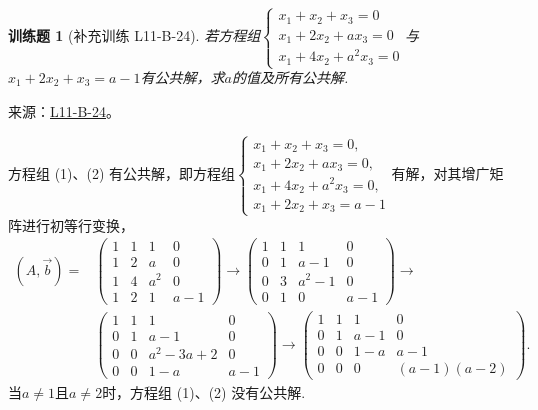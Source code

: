 \documentclass[UTF8,12pt,a4paper,fontset=fandol]{ctexart}
\newtheorem{exercise}{训练题}[section]
\begin{document}
\begin{exercise}[补充训练 L11-B-24]\label{prob:L11-B-24}
若方程组$\begin{cases}
                x_1+x_2+x_3=0   \\
                x_1+2x_2+ax_3=0 \\
                x_1+4x_2+a^2x_3=0
            \end{cases}$与$x_1+2x_2+x_3=a-1$有公共解，求$a$的值及所有公共解.
\end{exercise}
\noindent 来源：\href{https://github.com/yhwu-is/Linear-Algebra-Left-Undone/blob/new/%E8%AE%B2%E4%B9%89/%E4%B8%93%E9%A2%98/11%20%E6%9C%9D%E8%8A%B1%E5%A4%95%E6%8B%BE.tex}{L11-B-24}。
\begin{solve}
方程组 (1)、(2) 有公共解，即方程组$\begin{cases}
                x_1+x_2+x_3=0,     \\
                x_1+2x_2+ax_3=0,   \\
                x_1+4x_2+a^2x_3=0, \\
                x_1+2x_2+x_3=a-1
            \end{cases}$有解，对其增广矩阵进行初等行变换，
        \begin{align*}
            (A,\vec{b})= & \begin{pmatrix}
                           1 & 1 & 1   & 0   \\
                           1 & 2 & a   & 0   \\
                           1 & 4 & a^2 & 0   \\
                           1 & 2 & 1   & a-1
                       \end{pmatrix}\rightarrow
            \begin{pmatrix}
                1 & 1 & 1     & 0   \\
                0 & 1 & a-1   & 0   \\
                0 & 3 & a^2-1 & 0   \\
                0 & 1 & 0     & a-1
            \end{pmatrix}\rightarrow            \\
                     & \begin{pmatrix}
                           1 & 1 & 1        & 0   \\
                           0 & 1 & a-1      & 0   \\
                           0 & 0 & a^2-3a+2 & 0   \\
                           0 & 0 & 1-a      & a-1
                       \end{pmatrix}\rightarrow
            \begin{pmatrix}
                1 & 1 & 1   & 0          \\
                0 & 1 & a-1 & 0          \\
                0 & 0 & 1-a & a-1        \\
                0 & 0 & 0   & (a-1)(a-2)
            \end{pmatrix}.
        \end{align*}
        当$a\neq 1$且$a\neq 2$时，方程组 (1)、(2) 没有公共解.


\end{solve}
\end{document}
